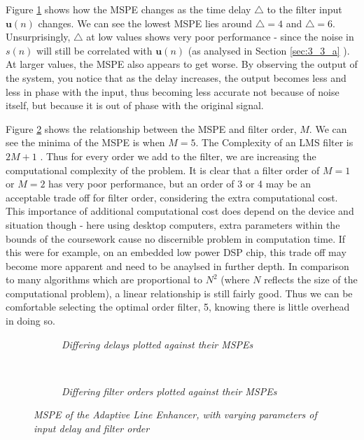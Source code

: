 \documentclass[./main.tex]{subfiles}
\begin{document}
Figure \ref{fig:3_3_b_delay} shows how the MSPE changes as the time delay  $ \bigtriangleup $ to the filter input $ \mathbf{u}(n) $ changes. We can see the lowest MSPE lies around $ \bigtriangleup = 4 $ and $ \bigtriangleup = 6$. Unsurprisingly, $ \bigtriangleup $ at low values shows very poor performance - since the noise in $ s(n) $ will still be correlated with $ \mathbf{u}(n) $ (as analysed in Section \ref{sec:3_3_a} ). At larger values, the MSPE also appears to get worse. By observing the output of the system, you notice that as the delay increases, the output becomes less and less in phase with the input, thus becoming less accurate not because of noise itself, but because it is out of phase with the original signal.

Figure \ref{fig:3_3_b_order} shows the relationship between the MSPE and filter order, $M$. We can see the minima of the MSPE is when $M = 5$. The Complexity of an LMS filter is $ 2M + 1 $ \cite{Dhiman2013}. Thus for every order we add to the filter, we are increasing the computational complexity of the problem. It is clear that a filter order of $M = 1$ or $M=2$ has very poor performance, but an order of 3 or 4 may be an acceptable trade off for filter order, considering the extra computational cost. This importance of additional computational cost does depend on the device and situation though - here using desktop computers, extra parameters within the bounds of the coursework cause no discernible problem in computation time. If this were for example, on an embedded low power DSP chip, this trade off may become more apparent and need to be anaylsed in further depth. In comparison to many algorithms which are proportional to $ N^2 $ (where $N$ reflects the size of the computational problem), a linear relationship is still fairly good. Thus we can be comfortable selecting the optimal order filter, 5, knowing there is little overhead in doing so.

\begin{figure}[h]
	\centering
	\begin{subfigure}[b]{0.49\textwidth}
		\resizebox{\textwidth}{2in}{}
		\caption{\textit{Differing delays plotted against their MSPEs}}
		\label{fig:3_3_b_delay}
	\end{subfigure}
	~ %
	\begin{subfigure}[b]{0.49\textwidth}
		\resizebox{\textwidth}{2in}{}
		\caption{\textit{Differing filter orders plotted against their MSPEs}}
		\label{fig:3_3_b_order}
	\end{subfigure}
	
	\label{fig:3_3_b_sweeps}
	\caption{\textit{MSPE of the Adaptive Line Enhancer, with varying parameters of input delay and filter order}}
\end{figure}
\end{document}

